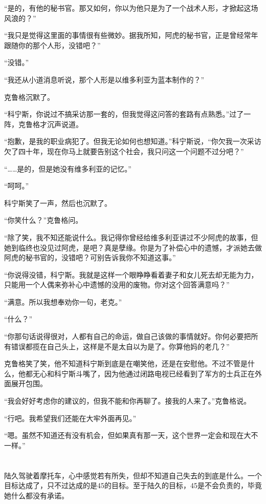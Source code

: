 “是的，有他的秘书官。那又如何，你以为他只是为了一个战术人形，才掀起这场风浪的？”

“我只是觉得这里面的事情很有些微妙。据我所知，阿虎的秘书官，正是曾经常年跟随你的那个人形，没错吧？”

“没错。”

“我还从小道消息听说，那个人形是以维多利亚为蓝本制作的？”

克鲁格沉默了。

“科宁斯，你说过不搞采访那一套的，但我觉得这问答的套路有点熟悉。”过了一阵，克鲁格才沉声说道。

“抱歉，是我的职业病犯了。但我无论如何也想知道。”科宁斯说，“你欠我一次采访欠了四十年，现在你马上就要告别这个社会，我只问这一个问题不过分吧？”

“……是的，但是她没有维多利亚的记忆。”

“呵呵。”

科宁斯笑了一声，然后也沉默了。

“你笑什么？”克鲁格问。

“除了笑，我不知还能说什么。我记得你曾经给维多利亚讲过不少阿虎的故事，但她到临终也没见过阿虎，是吧？真是孽缘。你是为了补偿心中的遗憾，才派她去做阿虎的秘书官的，没错吧？可别告诉我你不知道这事。”

“你说得没错，科宁斯。我就是这样一个眼睁睁看着妻子和女儿死去却无能为力，只能用一个人偶来弥补心中遗憾的没用的废物。你对这个回答满意吗？”

“满意。所以我想奉劝你一句，老克。”

“什么？”

“你那句话说得很对，人都有自己的命运，做自己该做的事情就好。你何必要把所有错误都揽在自己头上，这样是不是太自以为是了。你算他妈的老几？”

克鲁格笑了笑，他不知道科宁斯到底是在嘲笑他，还是在安慰他。不过不管是什么，他都无心和科宁斯斗嘴了，因为他通过闭路电视已经看到了军方的士兵正在外面展开包围。

“我会好好考虑你的建议的，但我不能和你再聊了。接我的人来了。”克鲁格说。

“行吧。我希望我们还能在大牢外面再见。”

“嗯。虽然不知道还有没有机会，但如果真有那一天，这个世界一定会和现在大不一样。”

\section*{}

陆久驾驶着摩托车，心中感觉若有所失，但却不知道自己失去的到底是什么。一个目标达成了，只不过达成的是45的目标。至于陆久的目标，45是不会负责的，毕竟她什么都没有承诺。


